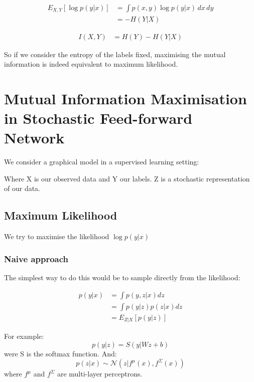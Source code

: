 \documentclass[10pt,oneside,openright]{report}
\begin{document}
\begin{align}
E_{X, Y}[\log p(y|x)] &= \int p(x, y)\log p(y| x)\, dx\,dy\\ 
&= - H(Y | X)\
\end{align}


\begin{align}
I(X, Y) &= H(Y) - H(Y|X)
\end{align}

So if we consider the entropy of the labels fixed, maximising the mutual information is indeed equivalent to maximum likelihood.

\section{Mutual Information Maximisation in Stochastic Feed-forward Network}

We consider a graphical model in a supervised learning setting:

\begin{figure}[H]
  \centering
\end{figure}

Where X is our observed data and Y our labels. Z is a stochastic representation of our data.

\subsection{Maximum Likelihood}

We try to maximise the likelihood $\log p(y|x)$

\subsubsection{Naive approach}

The simplest way to do this would be to sample directly from the likelihood:

\begin{align}
 p(y|x) &= \int p(y, z|x) dz \\
 &= \int p(y|z) p(z|x) dz \\
 &= E_{Z | X}[p(y|z)] 
\end{align}

For example:
$$ p(y|z) = S(y | Wz + b) $$ were S is the softmax function.
And:
$$ p(z|x) \sim \mathcal{N}(z | f^\mu(x), f^\Sigma(x))$$ where $f^\mu$ and $f^\Sigma$ are multi-layer perceptrons.
\end{document}
